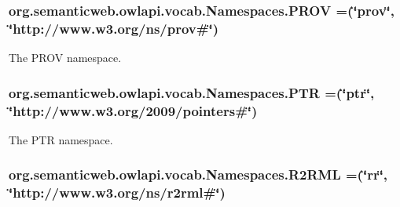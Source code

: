 \hypertarget{enumorg_1_1semanticweb_1_1owlapi_1_1vocab_1_1_namespaces_a92e9066a36b87ea21e2eb7af71f3fbb9}{
\subsubsection[{P\-R\-O\-V}]{\setlength{\rightskip}{0pt plus 5cm}org.\-semanticweb.\-owlapi.\-vocab.\-Namespaces.\-P\-R\-O\-V =(\char`\"{}prov\char`\"{}, \char`\"{}http\-://www.\-w3.\-org/{\bf ns}/prov\#\char`\"{})}}\label{enumorg_1_1semanticweb_1_1owlapi_1_1vocab_1_1_namespaces_a92e9066a36b87ea21e2eb7af71f3fbb9}
The P\-R\-O\-V namespace. \hypertarget{enumorg_1_1semanticweb_1_1owlapi_1_1vocab_1_1_namespaces_a7db6b3131a3ebbd801b40654bccd3db3}{
\subsubsection[{P\-T\-R}]{\setlength{\rightskip}{0pt plus 5cm}org.\-semanticweb.\-owlapi.\-vocab.\-Namespaces.\-P\-T\-R =(\char`\"{}ptr\char`\"{}, \char`\"{}http\-://www.\-w3.\-org/2009/pointers\#\char`\"{})}}\label{enumorg_1_1semanticweb_1_1owlapi_1_1vocab_1_1_namespaces_a7db6b3131a3ebbd801b40654bccd3db3}
The P\-T\-R namespace. \hypertarget{enumorg_1_1semanticweb_1_1owlapi_1_1vocab_1_1_namespaces_a01a27aa171d758e65853c452bd9209a1}{
\subsubsection[{R2\-R\-M\-L}]{\setlength{\rightskip}{0pt plus 5cm}org.\-semanticweb.\-owlapi.\-vocab.\-Namespaces.\-R2\-R\-M\-L =(\char`\"{}rr\char`\"{}, \char`\"{}http\-://www.\-w3.\-org/{\bf ns}/r2rml\#\char`\"{})}}\label{enumorg_1_1semanticweb_1_1owlapi_1_1vocab_1_1_namespaces_a01a27aa171d758e65853c452bd9209a1}
